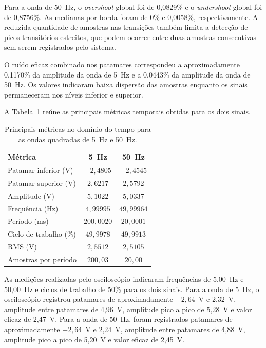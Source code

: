 \documentclass[a4paper,12pt]{fcte}
\begin{document}
Para a onda de 50~Hz, o \textit{overshoot} global foi de 0,0829\% e o \textit{undershoot} global foi de 0,8756\%. As medianas por borda foram de 0\% e 0,0058\%, respectivamente. A reduzida quantidade de amostras nas transições também limita a detecção de picos transitórios estreitos, que podem ocorrer entre duas amostras consecutivas sem serem registrados pelo sistema.

O ruído eficaz combinado nos patamares correspondeu a aproximadamente 0,1170\% da amplitude da onda de 5~Hz e a 0,0443\% da amplitude da onda de 50~Hz. Os valores indicaram baixa dispersão das amostras enquanto os sinais permaneceram nos níveis inferior e superior.

A Tabela~\ref{tab:metricas_tempo_quadradas} reúne as principais métricas temporais obtidas para os dois sinais.

\begin{table}[!htbp]
    \centering
    \caption{Principais métricas no domínio do tempo para as ondas quadradas de 5~Hz e 50~Hz.}
    \label{tab:metricas_tempo_quadradas}
    \small
    \begin{tabular}{l c c}
        \hline
        \textbf{Métrica} & \textbf{5~Hz} & \textbf{50~Hz} \\
        \hline
        Patamar inferior (V)      & $-2,4805$ & $-2,4545$ \\
        Patamar superior (V)      & $2,6217$  & $2,5792$  \\
        Amplitude (V)             & $5,1022$  & $5,0337$  \\
        Frequência (Hz)           & $4,99995$ & $49,99964$ \\
        Período (ms)              & $200,0020$ & $20,0001$ \\
        Ciclo de trabalho (\%)    & $49,9978$ & $49,9913$ \\
        RMS (V)                   & $2,5512$  & $2,5105$  \\
        Amostras por período      & $200,03$  & $20,00$   \\
        \hline
    \end{tabular}
\end{table}

As medições realizadas pelo osciloscópio indicaram frequências de 5,00~Hz e 50,00~Hz e ciclos de trabalho de 50\% para os dois sinais. Para a onda de 5~Hz, o osciloscópio registrou patamares de aproximadamente $-2,64$~V e 2,32~V, amplitude entre patamares de 4,96~V, amplitude pico a pico de 5,28~V e valor eficaz de 2,47~V. Para a onda de 50~Hz, foram registrados patamares de aproximadamente $-2,64$~V e 2,24~V, amplitude entre patamares de 4,88~V, amplitude pico a pico de 5,20~V e valor eficaz de 2,45~V.
\end{document}
